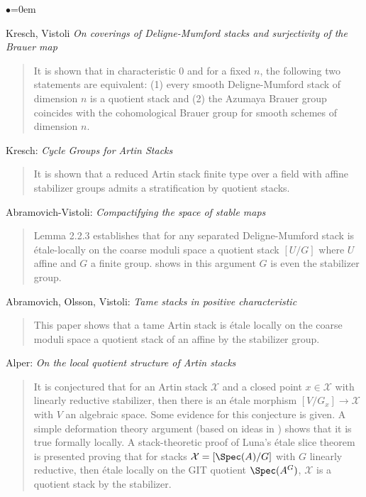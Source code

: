 \begin{list}{$\bullet$}{\leftmargin=0em}
\smallskip
\item
Kresch, Vistoli \emph{On coverings of Deligne-Mumford stacks and surjectivity
of the Brauer map} \cite{kresch-vistoli}
\begin{quote}
It is shown that in characteristic 0 and for a fixed $n$, the following two
statements are equivalent: (1) every smooth Deligne-Mumford stack of dimension
$n$ is a quotient stack and (2) the Azumaya Brauer group coincides with the
cohomological Brauer group for smooth schemes of dimension $n$.
\end{quote}
\smallskip
\item
Kresch: \emph{Cycle Groups for Artin Stacks} \cite{kresch_cycle}
\begin{quote}
It is shown that a reduced Artin stack finite type over a field with affine
stabilizer groups admits a stratification by quotient stacks.
\end{quote}
\smallskip
\item Abramovich-Vistoli:
\emph{Compactifying the space of stable maps} \cite{abramovich-vistoli}
\begin{quote}
Lemma 2.2.3 establishes that for any separated Deligne-Mumford stack is
\'etale-locally on the coarse moduli space a quotient stack $[U/G]$ where $U$
affine and $G$ a finite group. \cite[Theorem 2.12]{olsson_homstacks} shows in
this argument $G$ is even the stabilizer group.
\end{quote}
\smallskip
\item Abramovich, Olsson, Vistoli:
\emph{Tame stacks in positive characteristic} \cite{tame}
\begin{quote}
This paper shows that a tame Artin stack is \'etale locally on the coarse
moduli space a quotient stack of an affine by the stabilizer group.
\end{quote}
\smallskip
\item Alper: \emph{On the local quotient structure of Artin stacks}
\cite{alper_quotient}
\begin{quote}
It is conjectured that for an Artin stack $\mathcal{X}$ and a closed point $x
\in \mathcal{X}$
with linearly reductive stabilizer, then there is an \'etale morphism $[V/G_x]
\to \mathcal{X}$ with $V$ an algebraic space. Some evidence for this
conjecture is
given. A simple deformation theory argument (based on ideas in \cite{tame})
shows that it is true formally locally. A stack-theoretic proof of Luna's
\'etale slice theorem is presented proving that for stacks
$\mathcal{X} = [\Spec(A)/G]$
with $G$ linearly reductive, then \'etale locally on the GIT quotient
$\Spec(A^G)$, $\mathcal{X}$ is a quotient stack by the stabilizer.
\end{quote}
\end{list}

